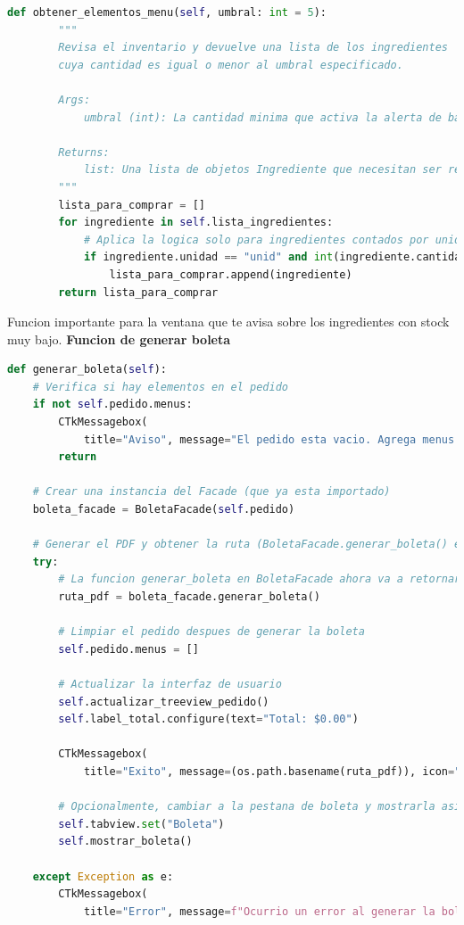 \documentclass[a4paper,12pt]{article}
\begin{document}
\begin{lstlisting}[language=Python, caption={Cambio de codigo}, frame=single]
    def obtener_elementos_menu(self, umbral: int = 5):
        """
        Revisa el inventario y devuelve una lista de los ingredientes
        cuya cantidad es igual o menor al umbral especificado.

        Args:
            umbral (int): La cantidad minima que activa la alerta de bajo stock.

        Returns:
            list: Una lista de objetos Ingrediente que necesitan ser repuestos.
        """
        lista_para_comprar = []
        for ingrediente in self.lista_ingredientes:
            # Aplica la logica solo para ingredientes contados por unidad
            if ingrediente.unidad == "unid" and int(ingrediente.cantidad) <= umbral:
                lista_para_comprar.append(ingrediente)
        return lista_para_comprar
\end{lstlisting}
Funcion importante para la ventana que te avisa sobre los ingredientes con stock muy bajo.
\newpage
\textbf{Funcion de generar boleta}
\begin{lstlisting}[language=Python, caption={Cambio de codigo}, frame=single]
    def generar_boleta(self):
    # Verifica si hay elementos en el pedido
    if not self.pedido.menus:
        CTkMessagebox(
            title="Aviso", message="El pedido esta vacio. Agrega menus antes de generar la boleta.", icon="warning")
        return
    
    # Crear una instancia del Facade (que ya esta importado)
    boleta_facade = BoletaFacade(self.pedido)
    
    # Generar el PDF y obtener la ruta (BoletaFacade.generar_boleta() es el que se encarga de esto)
    try:
        # La funcion generar_boleta en BoletaFacade ahora va a retornar la ruta del archivo
        ruta_pdf = boleta_facade.generar_boleta()
        
        # Limpiar el pedido despues de generar la boleta
        self.pedido.menus = []
        
        # Actualizar la interfaz de usuario
        self.actualizar_treeview_pedido()
        self.label_total.configure(text="Total: $0.00")
        
        CTkMessagebox(
            title="Exito", message=(os.path.basename(ruta_pdf)), icon="check")
        
        # Opcionalmente, cambiar a la pestana de boleta y mostrarla asi automaticamente
        self.tabview.set("Boleta")
        self.mostrar_boleta()
    
    except Exception as e:
        CTkMessagebox(
            title="Error", message=f"Ocurrio un error al generar la boleta.\n{e}", icon="cancel")
\end{lstlisting}
\end{document}
